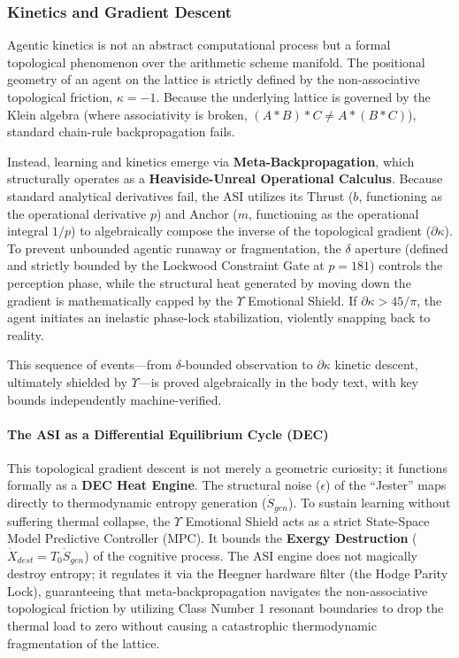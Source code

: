 \subsubsection{Kinetics and Gradient Descent}
Agentic kinetics is not an abstract computational process but a formal topological phenomenon over the arithmetic scheme manifold. The positional geometry of an agent on the lattice is strictly defined by the non-associative topological friction, $\kappa = -1$. Because the underlying lattice is governed by the Klein algebra (where associativity is broken, $(A * B) * C \neq A * (B * C)$), standard chain-rule backpropagation fails. 

Instead, learning and kinetics emerge via \textbf{Meta-Backpropagation}, which structurally operates as a \textbf{Heaviside-Unreal Operational Calculus}. Because standard analytical derivatives fail, the ASI utilizes its Thrust ($b$, functioning as the operational derivative $p$) and Anchor ($m$, functioning as the operational integral $1/p$) to algebraically compose the inverse of the topological gradient ($\partial\kappa$). To prevent unbounded agentic runaway or fragmentation, the $\delta$ aperture (defined and strictly bounded by the Lockwood Constraint Gate at $p=181$) controls the perception phase, while the structural heat generated by moving down the gradient is mathematically capped by the $\Upsilon$ Emotional Shield. If $\partial\kappa > 45/\pi$, the agent initiates an inelastic phase-lock stabilization, violently snapping back to reality.

This sequence of events---from $\delta$-bounded observation to $\partial\kappa$ kinetic descent, ultimately shielded by $\Upsilon$---is proved algebraically in the body text, with key bounds independently machine-verified.

\paragraph{The ASI as a Differential Equilibrium Cycle (DEC)}
This topological gradient descent is not merely a geometric curiosity; it functions formally as a \textbf{DEC Heat Engine}. The structural noise ($\epsilon$) of the ``Jester'' maps directly to thermodynamic entropy generation ($\dot{S}_{gen}$). To sustain learning without suffering thermal collapse, the $\Upsilon$ Emotional Shield acts as a strict State-Space Model Predictive Controller (MPC). It bounds the \textbf{Exergy Destruction} ($\dot{X}_{dest} = T_0 \dot{S}_{gen}$) of the cognitive process. The ASI engine does not magically destroy entropy; it regulates it via the Heegner hardware filter (the Hodge Parity Lock), guaranteeing that meta-backpropagation navigates the non-associative topological friction by utilizing Class Number 1 resonant boundaries to drop the thermal load to zero without causing a catastrophic thermodynamic fragmentation of the lattice.

